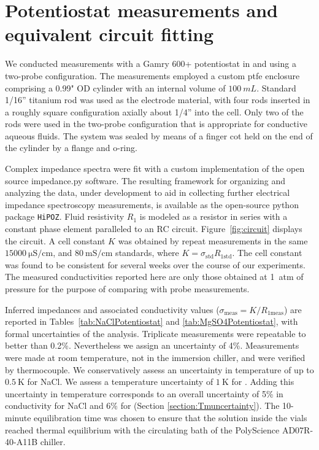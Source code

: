 \documentclass[journal=aesccq,manuscript=suppinfo]{achemso}
\begin{document}
\section{Potentiostat measurements and equivalent circuit fitting}
We conducted measurements with a Gamry 600+ potentiostat in  and  using a two-probe configuration. 
The measurements employed a custom ptfe enclosure comprising a 0.99" OD cylinder with an internal volume of $\SI{100}{mL}$. 
Standard 1/16'' titanium rod was used as the electrode material, with four rods inserted in a roughly square configuration axially about 1/4'' into the cell. 
Only two of the rods were used in the two-probe configuration that is appropriate for conductive aqueous fluids. 
The system was sealed by means of a finger cot held on the end of the cylinder by a flange and o-ring. 

Complex impedance spectra were fit with a custom implementation of the open source impedance.py software\citep{murbach2020impedance}.
The resulting framework for organizing and analyzing the data, under development to aid in collecting further electrical impedance spectroscopy measurements, is available as the open-source python package \verb|HiPOZ|\cite{vance2026HIPOZ}.
Fluid resistivity $R_1$ is modeled as a resistor in series with a constant phase element paralleled to an RC circuit. 
Figure~\ref{fig:circuit} displays the circuit.
A cell constant  $K$ was obtained by repeat measurements in the same $\SI{15 000}{\micro\siemens\per\centi\meter}$, and $\SI{80}{\milli\siemens\per\centi\meter}$ standards, where $K=\sigma_\mathrm{std}R_{1\mathrm{std}}$. 
The cell constant was found to be consistent for several weeks over the course of our experiments. 
The measured conductivities reported here are only those obtained at 1~atm of pressure for the purpose of comparing with probe measurements.
  
Inferred impedances and associated conductivity values ($\sigma_\mathrm{meas}=K/R_{1\mathrm{meas}}$) are reported in Tables~\ref{tab:NaClPotentiostat} and \ref{tab:MgSO4Potentiostat}, with formal uncertainties of the analysis.
Triplicate measurements were repeatable to better than 0.2\%.
Nevertheless we assign an uncertainty of 4\%.
Measurements were made at room temperature, not in the immersion chiller, and were verified by thermocouple. 
We conservatively assess an uncertainty in temperature of up to $\SI{0.5}{\kelvin}$ for NaCl.
We assess a temperature uncertainty of $\SI{1}{\kelvin}$ for . 
Adding this uncertainty in temperature corresponds to an overall uncertainty of 5\% in conductivity for NaCl and 6\% for  (Section \ref{section:Tmuncertainty}). 
The 10-minute equilibration time was chosen to ensure that the solution inside the vials reached thermal equilibrium with the circulating bath of the PolyScience AD07R-40-A11B chiller.
\end{document}
